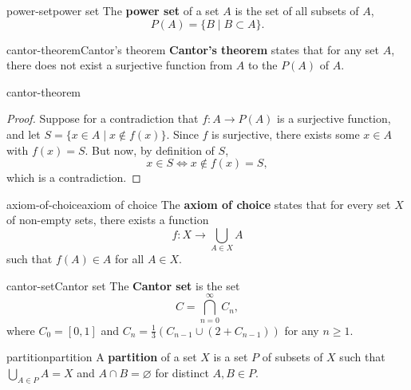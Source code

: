 \begin{topic}{power-set}{power set}
    The \textbf{power set} of a set $A$ is the set of all subsets of $A$,
    \[ P(A) = \{ B \mid B \subset A \} . \]
\end{topic}

\begin{topic}{cantor-theorem}{Cantor's theorem}
    \textbf{Cantor's theorem} states that for any set $A$, there does not exist a surjective function from $A$ to the  $P(A)$ of $A$.
\end{topic}

\begin{example}{cantor-theorem}
    \begin{proof}
        Suppose for a contradiction that $f : A \to P(A)$ is a surjective function, and let $S = \{ x \in A \mid x \not\in f(x) \}$. Since $f$ is surjective, there exists some $x \in A$ with $f(x) = S$. But now, by definition of $S$,
        \[ x \in S \iff x \not\in f(x) = S , \]
        which is a contradiction.
    \end{proof}
\end{example}

\begin{topic}{axiom-of-choice}{axiom of choice}
    The \textbf{axiom of choice} states that for every set $X$ of non-empty sets, there exists a function
    \[ f : X \to \bigcup_{A \in X} A \]
    such that $f(A) \in A$ for all $A \in X$.
\end{topic}

\begin{topic}{cantor-set}{Cantor set}
    The \textbf{Cantor set} is the set
    \[ C = \bigcap_{n = 0}^{\infty} C_n , \]
    where $C_0 = [0, 1]$ and $C_n = \frac{1}{3} \left( C_{n - 1} \cup (2 + C_{n - 1}) \right)$ for any $n \ge 1$.
\end{topic}

\begin{topic}{partition}{partition}
    A \textbf{partition} of a set $X$ is a set $P$ of subsets of $X$ such that $\bigcup_{A \in P} A = X$ and $A \cap B = \varnothing$ for distinct $A, B \in P$.
\end{topic}
